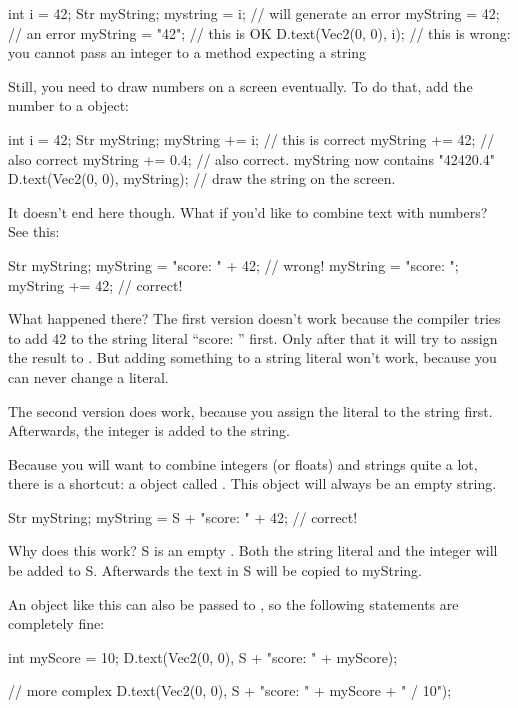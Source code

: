 \begin{code}
int i = 42;
Str myString;
mystring = i; // will generate an error
myString = 42; // an error
myString = "42"; // this is OK
D.text(Vec2(0, 0), i); // this is wrong: you cannot pass an integer to a method expecting a string
\end{code}

Still, you need to draw numbers on a screen eventually. To do that, add the number to a  object:

\begin{code}
int i = 42;
Str myString;
myString += i; // this is correct
myString += 42; // also correct
myString += 0.4; // also correct. myString now contains "42420.4"
D.text(Vec2(0, 0), myString); // draw the string on the screen.
\end{code}

It doesn't end here though. What if you'd like to combine text with numbers? See this:

\begin{code}
Str myString;
myString = "score: " + 42; // wrong!
myString = "score: ";
myString += 42; // correct!
\end{code}
 
What happened there? The first version doesn't work because the compiler tries to add 42 to the string literal ``score: '' first. Only after that it will try to assign the result to . But adding something to a string literal won't work, because you can never change a literal.

The second version does work, because you assign the literal to the string first. Afterwards, the integer is added to the string.

Because you will want to combine integers (or floats) and strings quite a lot, there is a shortcut: a  object called . This object will always be an empty string.

\begin{code}
Str myString;
myString = S + "score: " + 42; // correct!
\end{code}

Why does this work? S is an empty . Both the string literal and the integer will be added to S. Afterwards the text in S will be copied to myString.

An object like this can also be passed to , so the following statements are completely fine:

\begin{code}
int myScore = 10;
D.text(Vec2(0, 0), S + "score: " + myScore);

// more complex
D.text(Vec2(0, 0), S + "score: " + myScore + " / 10");
\end{code}

